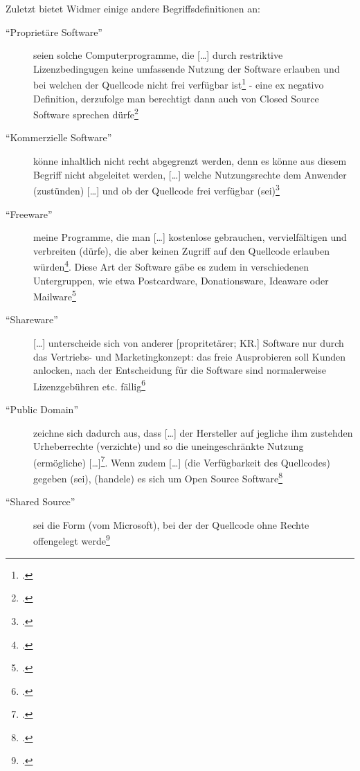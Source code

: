 \documentclass[DIV=calc,BCOR=5mm,11pt,headings=small,oneside,abstract=true, toc=bib]{scrartcl}
\begin{document}
 Zuletzt bietet Widmer einige andere Begriffsdefinitionen an:
 \begin{description}
  \item[``Proprietäre Software''] seien solche \glqq{}Computerprogramme\grqq{},
  die \glqq{}[\ldots] durch restriktive Lizenzbedingugen keine umfassende
  Nutzung der Software erlauben und bei welchen der Quellcode nicht frei
  verfügbar ist\grqq{}\footcite[vgl.][39]{Widmer2003a} - eine ex negativo
  Definition, derzufolge man berechtigt dann auch von \glqq{}Closed
  Source Software\grqq{} sprechen dürfe\footcite[vgl.][39]{Widmer2003a}
  \item[``Kommerzielle Software'']  könne inhaltlich nicht recht abgegrenzt
  werden, denn es könne aus diesem Begriff nicht abgeleitet werden,
  \glqq{}[\ldots] welche Nutzungsrechte dem Anwender (zustünden) [\ldots]
  und ob der Quellcode frei verfügbar
  (sei)\grqq{}\footcite[vgl.][40]{Widmer2003a}
  \item[``Freeware''] meine Programme, die man \glqq{}[\ldots]
  kostenlose gebrauchen, vervielfältigen und verbreiten (dürfe)\grqq{}, die aber
  keinen Zugriff auf den Quellcode erlauben
  würden\footcite[vgl.][40]{Widmer2003a}. Diese Art der Software gäbe es zudem
  in verschiedenen \glqq{}Untergruppen\grqq{}, wie etwa
  \glqq{}Postcardware, Donationsware, Ideaware oder
  Mailware\grqq{}\footcite[vgl.][41]{Widmer2003a}
  \item[``Shareware''] \glqq{}[\ldots] unterscheide sich von anderer
  [propritetärer; KR.] Software nur durch das Vertriebs- und
  Marketingkonzept\grqq{}: das freie Ausprobieren soll Kunden anlocken, nach der
  Entscheidung für die Software sind normalerweise Lizenzgebühren etc.
  fällig\footcite[vgl.][42]{Widmer2003a}
  \item[``Public Domain''] zeichne sich dadurch aus, dass \glqq{}[\ldots]
  der Hersteller auf jegliche ihm zustehden Urheberrechte (verzichte) und
  so die uneingeschränkte Nutzung (ermögliche)
  [\ldots]\grqq{}\footcite[vgl.][44]{Widmer2003a}. Wenn zudem \glqq{}[\ldots]
  (die Verfügbarkeit des Quellcodes) gegeben (sei), (handele) es sich um
  Open Source Software\grqq{}\footcite[vgl.][44. Dies ist ein
  gefährliches Fazit insofern, als Widmer selbst die Public Domain
  Software soäter als unzureichend zur Erfüllung des Open Source
  Gedankesn klassifizieren wird]{Widmer2003a}
  \item[``Shared Source''] sei die Form (vom Microsoft), bei der der Quellcode
  ohne Rechte offengelegt werde\footcite[vgl.][4ff]{Widmer2003a}
\end{description}
\end{document}
